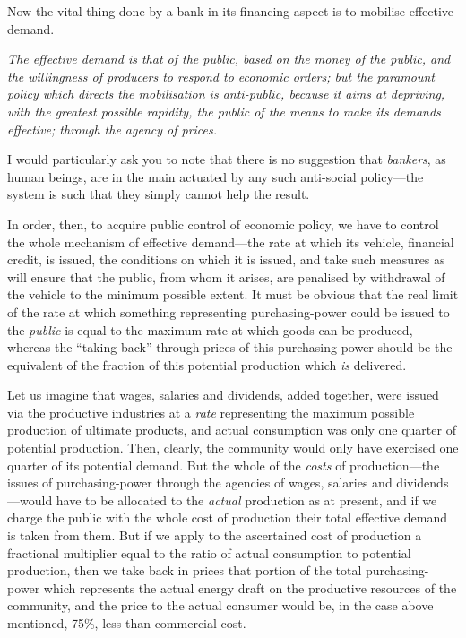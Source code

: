 \documentclass{book}
\begin{document}
Now the vital thing done by a bank in its financing aspect is to mobilise effective demand.

\emph{The effective demand is that of the public, based on the money of the public, and the willingness of producers to respond to economic orders; but the paramount policy which directs the mobilisation is anti-public, because it aims at depriving, with the greatest possible rapidity, the public of the means to make its demands effective; through the agency of prices.}

I would particularly ask you to note that there is no suggestion that \emph{bankers}, as human beings, are in the main actuated by any such anti-social policy—the system is such that they simply cannot help the result.

In order, then, to acquire public control of economic policy, we have to control the whole mechanism of effective demand—the rate at which its vehicle, financial credit, is issued, the conditions on which it is issued, and take such measures as will ensure that the public, from whom it arises, are penalised by withdrawal of the vehicle to the minimum possible extent. It must be obvious that the real limit of the rate at which something representing purchasing-power could be issued to the \emph{public} is equal to the maximum rate at which goods can be produced, whereas the “taking back” through prices of this purchasing-power should be the equivalent of the fraction of this potential production which \emph{is} delivered.

Let us imagine that wages, salaries and dividends, added together, were issued via the productive industries at a \emph{rate} representing the maximum possible production of ultimate products, and actual consumption was only one quarter of potential production. Then, clearly, the community would only have exercised one quarter of its potential demand. But the whole of the \emph{costs} of production—the issues of purchasing-power through the agencies of wages, salaries and dividends—would have to be allocated to the \emph{actual} production as at present, and if we charge the public with the whole cost of production their total effective demand is taken from them. But if we apply to the ascertained cost of production a fractional multiplier equal to the ratio of actual consumption to potential production, then we take back in prices that portion of the total purchasing-power which represents the actual energy draft on the productive resources of the community, and the price to the actual consumer would be, in the case above mentioned, 75\%, less than commercial cost.
\end{document}
